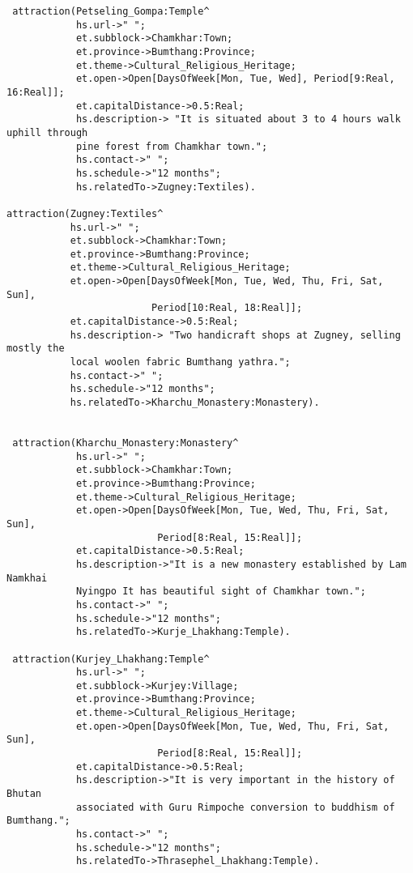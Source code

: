 \begin{verbatim}
 attraction(Petseling_Gompa:Temple^
            hs.url->" ";
            et.subblock->Chamkhar:Town;
            et.province->Bumthang:Province;
            et.theme->Cultural_Religious_Heritage;
            et.open->Open[DaysOfWeek[Mon, Tue, Wed], Period[9:Real, 16:Real]];
            et.capitalDistance->0.5:Real;
            hs.description-> "It is situated about 3 to 4 hours walk uphill through 
            pine forest from Chamkhar town.";
            hs.contact->" ";
            hs.schedule->"12 months";
            hs.relatedTo->Zugney:Textiles).
                          
attraction(Zugney:Textiles^
           hs.url->" ";
           et.subblock->Chamkhar:Town;
           et.province->Bumthang:Province;
           et.theme->Cultural_Religious_Heritage;
           et.open->Open[DaysOfWeek[Mon, Tue, Wed, Thu, Fri, Sat, Sun],
                         Period[10:Real, 18:Real]];
           et.capitalDistance->0.5:Real;
           hs.description-> "Two handicraft shops at Zugney, selling mostly the 
           local woolen fabric Bumthang yathra.";
           hs.contact->" ";
           hs.schedule->"12 months";
           hs.relatedTo->Kharchu_Monastery:Monastery).                                
                              
                          
 attraction(Kharchu_Monastery:Monastery^
            hs.url->" ";
            et.subblock->Chamkhar:Town;
            et.province->Bumthang:Province;
            et.theme->Cultural_Religious_Heritage;
            et.open->Open[DaysOfWeek[Mon, Tue, Wed, Thu, Fri, Sat, Sun],
                          Period[8:Real, 15:Real]];
            et.capitalDistance->0.5:Real;
            hs.description->"It is a new monastery established by Lam Namkhai 
            Nyingpo It has beautiful sight of Chamkhar town.";
            hs.contact->" ";
            hs.schedule->"12 months";
            hs.relatedTo->Kurje_Lhakhang:Temple).
                             
 attraction(Kurjey_Lhakhang:Temple^
            hs.url->" ";
            et.subblock->Kurjey:Village;
            et.province->Bumthang:Province;
            et.theme->Cultural_Religious_Heritage;
            et.open->Open[DaysOfWeek[Mon, Tue, Wed, Thu, Fri, Sat, Sun],
                          Period[8:Real, 15:Real]];
            et.capitalDistance->0.5:Real;
            hs.description->"It is very important in the history of Bhutan 
            associated with Guru Rimpoche conversion to buddhism of Bumthang.";
            hs.contact->" ";
            hs.schedule->"12 months";
            hs.relatedTo->Thrasephel_Lhakhang:Temple).
						   

\end{verbatim}
